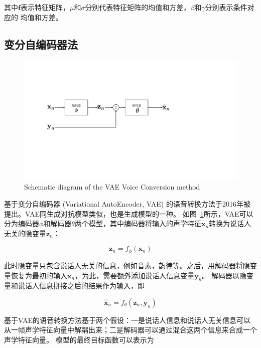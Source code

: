 其中$\mathbf{f}$表示特征矩阵，$\mu$和$\sigma$分别代表特征矩阵的均值和方差，$\beta$和$\gamma$分别表示条件对应的
均值和方差。

\subsection{变分自编码器法}

\begin{figure}[!htp]
    \centering
    \includegraphics[width=13cm,trim=30 170 170 130,clip]{figure/3_vae.pdf}
    {Schematic diagram of the VAE Voice Conversion method}
    \label{fig:vae}
\end{figure}

基于变分自编码器 (Variational AutoEncoder, VAE) 的语音转换方法于2016年被提出。VAE同生成对抗模型类似，也是生成模型的一种。
如图~\ref{fig:vae}所示，VAE可以分为编码器$\phi$和解码器$\theta$两个模型，其中编码器将输入的声学特征$\mathbf{x}_n$转换为说话人无关的隐变量$\mathbf{z}_n$：

\begin{equation}
    \mathbf{z}_n = f_{\phi}(\mathbf{x}_n)
\end{equation}

此时隐变量只包含说话人无关的信息，例如音素，韵律等。之后，用解码器将隐变量恢复为最初的输入$\mathbf{x}_n$，为此，需要额外添加说话人信息变量$\mathbf{y}_n$。
解码器以隐变量和说话人信息拼接之后的结果作为输入，即

\begin{equation}
    \hat{\mathbf{x}}_n = f_{\theta}(\mathbf{z}_n,\mathbf{y}_n)
\end{equation}

基于VAE的语音转换方法基于两个假设：一是说话人信息和说话人无关信息可以从一帧声学特征向量中解耦出来；二是解码器可以通过混合这两个信息来合成一个声学特征向量。
模型的最终目标函数可以表示为

